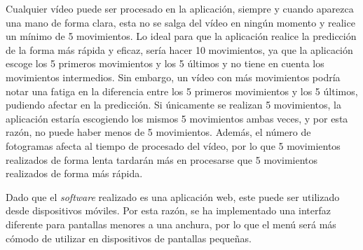 Cualquier vídeo puede ser procesado en la aplicación, siempre y cuando aparezca una mano de forma clara, esta no se salga del vídeo en ningún momento y realice un mínimo de 5 movimientos. Lo ideal para que la aplicación realice la predicción de la forma más rápida y eficaz, sería hacer 10 movimientos, ya que la aplicación escoge los 5 primeros movimientos y los 5 últimos y no tiene en cuenta los movimientos intermedios. Sin embargo, un vídeo con más movimientos podría notar una fatiga en la diferencia entre los 5 primeros movimientos y los 5 últimos, pudiendo afectar en la predicción. Si únicamente se realizan 5 movimientos, la aplicación estaría escogiendo los mismos 5 movimientos ambas veces, y por esta razón, no puede haber menos de 5 movimientos. Además, el número de fotogramas afecta al tiempo de procesado del vídeo, por lo que 5 movimientos realizados de forma lenta tardarán más en procesarse que 5 movimientos realizados de forma más rápida.

Dado que el \textit{software} realizado es una aplicación web, este puede ser utilizado desde dispositivos móviles. Por esta razón, se ha implementado una interfaz diferente para pantallas menores a una anchura, por lo que el menú será más cómodo de utilizar en dispositivos de pantallas pequeñas.
